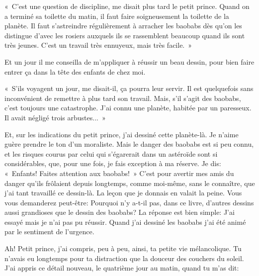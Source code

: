 \documentclass[a4paper]{report}
\begin{document}

«~C'est une question de discipline, me disait plus tard le petit prince. Quand on a terminé sa toilette du matin, il faut faire soigneusement la toilette de la planète. Il faut s'astreindre régulièrement à arracher les baobabs dès qu'on les distingue d'avec les rosiers auxquels ils se rassemblent beaucoup quand ils sont très jeunes. C'est un travail très ennuyeux, mais très facile.~» 


Et un jour il me conseilla de m'appliquer à réussir un beau dessin, pour bien faire entrer ça dans la tête des enfants de chez moi.

«~S'ils voyagent un jour, me disait-il, ça pourra leur servir. Il est quelquefois sans inconvénient de remettre à plus tard son travail. Mais, s'il s'agit des baobabs, c'est toujours une catastrophe. J'ai connu une planète, habitée par un paresseux. Il avait négligé trois arbustes...~»

Et, sur les indications du petit prince, j'ai dessiné cette planète-là. Je n'aime guère prendre le ton d'un moraliste. Mais le danger des baobabs est si peu connu, et les risques courus par celui qui s'égarerait dans un astéroïde sont si considérables, que, pour une fois, je fais exception à ma réserve. Je dis: «~Enfants! Faites attention aux baobabs!~» C'est pour avertir mes amis du danger qu'ils frôlaient depuis longtemps, comme moi-même, sans le connaître, que j'ai tant travaillé ce dessin-là. La leçon que je donnais en valait la peine. Vous vous demanderez peut-être: Pourquoi n'y a-t-il pas, dans ce livre, d'autres dessins aussi grandioses que le dessin des baobabs? La réponse est bien simple: J'ai essayé mais je n'ai pas pu réussir. Quand j'ai dessiné les baobabs j'ai été animé par le sentiment de l'urgence.

\parachapter[VI]{} %
Ah! Petit prince, j'ai compris, peu à peu, ainsi, ta petite vie mélancolique. Tu n'avais eu longtemps pour ta distraction que la douceur des couchers du soleil. J'ai appris ce détail nouveau, le quatrième jour au matin, quand tu m'as dit:
\end{document}
